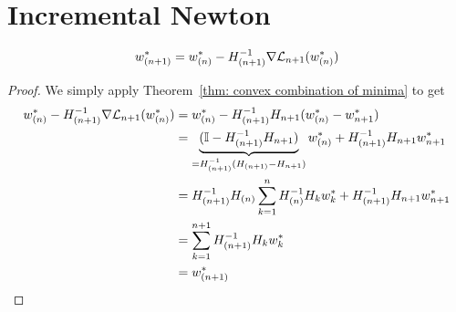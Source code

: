 \section{Incremental Newton}

\begin{theorem}
	\begin{align*}
		w^*_{(n+1)}
		= w^*_{(n)} - H_{(n+1)}^{-1}\nabla\mathcal{L}_{n+1}(w^*_{(n)})
	\end{align*}
\end{theorem}
\begin{proof}
	We simply apply Theorem~\ref{thm: convex combination of minima} to get
	\begin{align*}
		w^*_{(n)} - H_{(n+1)}^{-1}\nabla\mathcal{L}_{n+1}(w^*_{(n)})
		&= w^*_{(n)} - H_{(n+1)}^{-1}H_{n+1}(w^*_{(n)} - w^*_{n+1} )\\
		&= \underbrace{(\mathbb{I} - H_{(n+1)}^{-1}H_{n+1})}_{
			= H_{(n+1)}^{-1}(H_{(n+1)} - H_{n+1})
		}w^*_{(n)} + H_{(n+1)}^{-1}H_{n+1}w^*_{n+1}\\
		&= H_{(n+1)}^{-1} H_{(n)} \sum_{k=1}^n H_{(n)}^{-1}H_k w^*_k
 		+ H_{(n+1)}^{-1}H_{n+1}w^*_{n+1}\\
		&=\sum_{k=1}^{n+1} H_{(n+1)}^{-1}H_k w^*_k\\
		&=w^*_{(n+1)}
		\qedhere
	\end{align*}
\end{proof}